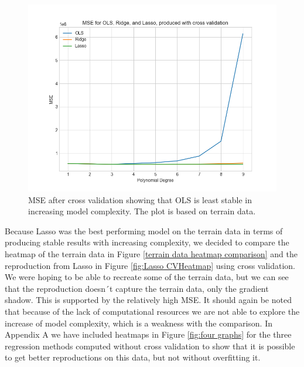 \begin{figure}[H]
     \includegraphics[width=\textwidth]{Images/CV_terrain_data.png}
     \caption{MSE after cross validation showing that OLS is least stable in increasing model complexity. The plot is based on terrain data.}
     \label{CV_terraindata}
\end{figure}

Because Lasso was the best performing model on the terrain data in terms of producing stable results with increasing complexity, we decided to compare the heatmap of the terrain data in Figure \ref{terrain data heatmap comparison} and the reproduction from Lasso in Figure \ref{fig:Lasso CVHeatmap} using cross validation. We were hoping to be able to recreate some of the terrain data, but we can see that the reproduction doesn´t capture the terrain data, only the gradient shadow. This is supported by the relatively high MSE. It should again be noted that because of the lack of computational resources we are not able to explore the increase of model complexity, which is a weakness with the comparison. In Appendix A we have included heatmaps in Figure \ref{fig:four graphs} for the three regression methods computed without cross validation to show that it is possible to get better reproductions on this data, but not without overfitting it. 

